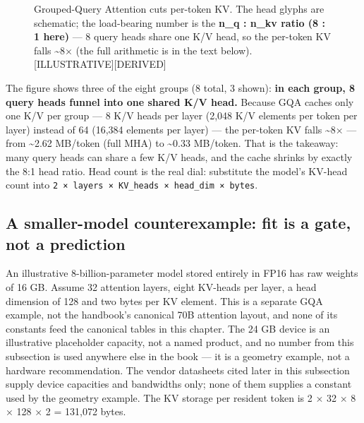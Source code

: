 \begin{figure}
\centering
{}
\caption[Grouped-Query Attention cuts per-token KV]{Grouped-Query Attention cuts per-token KV. The head glyphs are schematic; the load-bearing number is the \textbf{n\_q : n\_kv ratio (8 : 1 here)} --- 8 query heads share one K/V head, so the per-token KV falls \textasciitilde8× (the full arithmetic is in the text below). \mbox{{[}ILLUSTRATIVE{]}}\hspace{0pt}\mbox{{[}DERIVED{]}}}

\label{fig:7.1}\end{figure}

The figure shows three of the eight groups (8 total, 3 shown):
\textbf{in each group, 8 query heads funnel into one shared K/V head.}
Because GQA caches only one K/V per group --- 8 K/V heads per layer
(2,048 K/V elements per token per layer) instead of 64 (16,384 elements
per layer) --- the per-token KV falls \textasciitilde8× --- from
\textasciitilde2.62 MB/token (full MHA) to \textasciitilde0.33 MB/token.
That is the takeaway: many query heads can share a few K/V heads, and
the cache shrinks by exactly the 8:1 head ratio. Head count is the real
dial: substitute the model's KV-head count into
\texttt{2\ ×\ layers\ ×\ KV\_heads\ ×\ head\_dim\ ×\ bytes}.

\subsection{A smaller-model counterexample: fit is a gate, not a
prediction}\label{a-smaller-model-counterexample-fit-is-a-gate-not-a-prediction}

An illustrative 8-billion-parameter model stored entirely in FP16 has
raw weights of 16 GB. Assume 32 attention layers, eight KV-heads per
layer, a head dimension of 128 and two bytes per KV element. This is a
separate GQA example, not the handbook's canonical 70B attention layout,
and none of its constants feed the canonical tables in this chapter. The
24 GB device is an illustrative placeholder capacity, not a named
product, and no number from this subsection is used anywhere else in the
book --- it is a geometry example, not a hardware recommendation. The
vendor datasheets cited later in this subsection supply device
capacities and bandwidths only; none of them supplies a constant used by
the geometry example. The KV storage per resident token is 2 × 32 × 8 ×
128 × 2 = 131,072 bytes.

